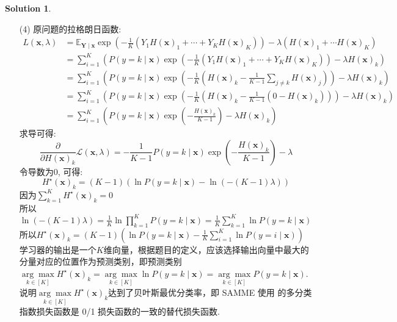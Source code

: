 \documentclass[a4paper,UTF8]{article}
\numberwithin{equation}{section}
\theoremstyle{definition}
\newtheorem*{solution}{Solution}
\begin{document}
\begin{solution}
\begin{enumerate}
        \item [(4)]
        原问题的拉格朗日函数:
        \begin{equation}
            \begin{aligned} L(\boldsymbol{x}, \lambda) & =\mathbb{E}_{\boldsymbol{Y} \mid \boldsymbol{x}} \exp \left(-\frac{1}{K}\left(Y_{1} H(\boldsymbol{x})_{1}+\cdots+Y_{K} H(\boldsymbol{x})_{K}\right)\right)-\lambda \left(H(\boldsymbol{x})_1 + \cdots H(\boldsymbol{x})_K \right) \\ & =\sum_{i=1}^{K}\left(P(y=k \mid \boldsymbol{x}) \exp \left(-\frac{1}{K}\left(Y_{1} H(\boldsymbol{x})_{1}+\cdots+Y_{K} H(\boldsymbol{x})_{K}\right)\right)-\lambda H(\boldsymbol{x})_{k}\right) \\ &= \sum_{i=1}^{K}\left(P(y=k \mid \boldsymbol{x}) \exp \left(-\frac{1}{K}\left(H(\boldsymbol{x})_{k}-\frac{1}{K-1} \sum_{j \neq k} H(\boldsymbol{x})_{j}\right)\right)-\lambda H(\boldsymbol{x})_{k}\right)\\& =\sum_{i=1}^{K}\left(P(y=k \mid \boldsymbol{x}) \exp \left(-\frac{1}{K}\left(H(\boldsymbol{x})_{k}-\frac{1}{K-1} (0-H (\boldsymbol{x})_k)\right)\right)-\lambda H(\boldsymbol{x})_{k}\right) \\ & =\sum_{i=1}^{K}\left(P(y=k \mid \boldsymbol{x}) \exp \left(-\frac{H(\boldsymbol{x})_{k}}{K-1}\right)-\lambda H(\boldsymbol{x})_{k}\right)\end{aligned} \nonumber
        \end{equation}
        求导可得:
        $$\frac{\partial}{\partial H(\boldsymbol{x})_{k}} \mathcal{L}(\boldsymbol{x}, \lambda)=-\frac{1}{K-1} P(y=k \mid \boldsymbol{x}) \exp \left(-\frac{H(\boldsymbol{x})_{k}}{K-1}\right)-\lambda$$
        令导数为0, 可得:
        $$H^{\star}(\boldsymbol{x})_{k}=(K-1)(\ln P(y=k \mid \boldsymbol{x})-\ln (-(K-1) \lambda))$$
        因为$\sum_{k=1}^{K} H^{\star}(\boldsymbol{x})_{k} = 0$ \\
        所以$\ln (-(K-1) \lambda)=\frac{1}{K} \ln \prod_{k=1}^{K} P(y=k \mid \boldsymbol{x})=\frac{1}{K} \sum_{k=1}^{K} \ln P(y=k \mid \boldsymbol{x})$ \\
        所以$H^{\star}(\boldsymbol{x})_{k}=(K-1)\left(\ln P(y=k \mid \boldsymbol{x})-\frac{1}{K} \sum_{i=1}^{K} \ln P(y=i \mid \boldsymbol{x})\right)$ \\
        学习器的输出是一个$K$维向量，根据题目的定义，应该选择输出向量中最大的分量对应的位置作为预测类别，即预测类别$\underset{k \in [K]}{\arg \max } H^{\star}(\boldsymbol{x})_{k}=\underset{k \in [K]}{\arg \max } \ln P(y=k \mid \boldsymbol{x})=\underset{k \in [K]}{\arg \max } P(y=k \mid \boldsymbol{x})$.\\
        说明$\underset{k \in [K]}{\arg \max } H^{\star}(\boldsymbol{x})_{k}$达到了贝叶斯最优分类率，即 SAMME 使用
        的多分类指数损失函数是 0/1 损失函数的一致的替代损失函数.
    \end{enumerate}
\end{solution}
\end{document}
